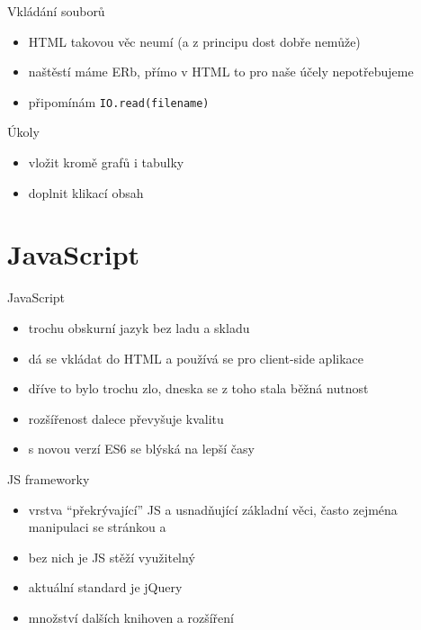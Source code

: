 \documentclass{beamer}
\begin{document}
\begin{frame}[fragile]{Vkládání souborů}
  \begin{itemize}
    \item HTML takovou věc neumí (a z principu dost dobře nemůže)
    \item naštěstí máme ERb, přímo v HTML to pro naše účely nepotřebujeme
    \item připomínám \texttt{IO.read(filename)}
  \end{itemize}
\end{frame}

\begin{frame}{Úkoly}
  \begin{itemize}
    \item vložit kromě grafů i tabulky
    \item doplnit klikací obsah
  \end{itemize}
\end{frame}


\section{JavaScript}

\begin{frame}{JavaScript}
  \begin{itemize}
    \item trochu obskurní jazyk bez ladu a skladu
    \item dá se vkládat do HTML a používá se pro client-side aplikace
    \item dříve to bylo trochu zlo, dneska se z toho stala běžná nutnost
    \item rozšířenost dalece převyšuje kvalitu
    \item s novou verzí ES6 se blýská na lepší časy
  \end{itemize}
\end{frame}

\begin{frame}{JS frameworky}
  \begin{itemize}
    \item vrstva ``překrývající'' JS a usnadňující základní věci, často zejména manipulaci se stránkou a
    \item bez nich je JS stěží využitelný
    \item aktuální standard je jQuery
    \item množství dalších knihoven a rozšíření
  \end{itemize}
\end{frame}
\end{document}

